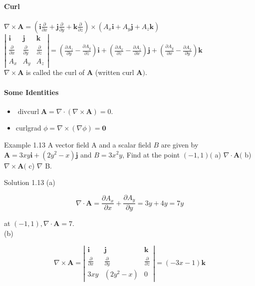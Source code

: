 \documentclass[10pt]{article}
\numberwithin{equation}{section}
\begin{document}
\paragraph{Curl}\label{sec:1-9-2-4}
$\nabla \times \mathbf{A}=\left(\mathbf{i} \frac{\partial}{\partial x}+\mathbf{j} \frac{\partial}{\partial y}+\mathbf{k} \frac{\partial}{\partial z}\right) \times\left(A_{x} \mathbf{i}+A_{y} \mathbf{j}+A_{z} \mathbf{k}\right)$\\
$\left|\begin{array}{lll}\mathbf{i} & \mathbf{j} & \mathbf{k} \\ \frac{\partial}{\partial x} & \frac{\partial}{\partial y} & \frac{\partial}{\partial z} \\ A_{x} & A_{y} & A_{z}\end{array}\right|=\left(\frac{\partial A_{z}}{\partial y}-\frac{\partial A_{y}}{\partial z}\right) \mathbf{i}+\left(\frac{\partial A_{x}}{\partial z}-\frac{\partial A_{z}}{\partial x}\right) \mathbf{j}+\left(\frac{\partial A_{y}}{\partial x}-\frac{\partial A_{x}}{\partial y}\right) \mathbf{k}$\\
$\nabla \times \mathbf{A}$ is called the curl of $\mathbf{A}$ (written curl $\mathbf{A})$.

\paragraph{Some Identities}\label{sec:1-9-2-5}
\begin{itemize}
  \item $\operatorname{divcurl} \mathbf{A}=\nabla \cdot(\nabla \times \mathbf{A})=0$.
  \item curlgrad $\phi=\nabla \times(\nabla \phi)=\mathbf{0}$
\end{itemize}

Example 1.13 A vector field A and a scalar field $B$ are given by $\mathbf{A}=3 x y \mathbf{i}+\left(2 y^{2}-x\right) \mathbf{j}$ and $B=3 x^{2} y$, Find at the point $(-1,1)($ a) $\nabla \cdot \mathbf{A}($ b) $\nabla \times \mathbf{A}($ c) $\nabla$ B.

Solution 1.13 (a)

$$
\nabla \cdot \mathbf{A}=\frac{\partial A_{x}}{\partial x}+\frac{\partial A_{y}}{\partial y}=3 y+4 y=7 y
$$

at $(-1,1), \nabla \cdot \mathbf{A}=7$.\\
(b)

$$
\nabla \times \mathbf{A}=\left|\begin{array}{lll}
\mathbf{i} & \mathbf{j} & \mathbf{k} \\
\frac{\partial}{\partial x} & \frac{\partial}{\partial y} & \frac{\partial}{\partial z} \\
3 x y & \left(2 y^{2}-x\right) & 0
\end{array}\right|=(-3 x-1) \mathbf{k}
$$
\end{document}
